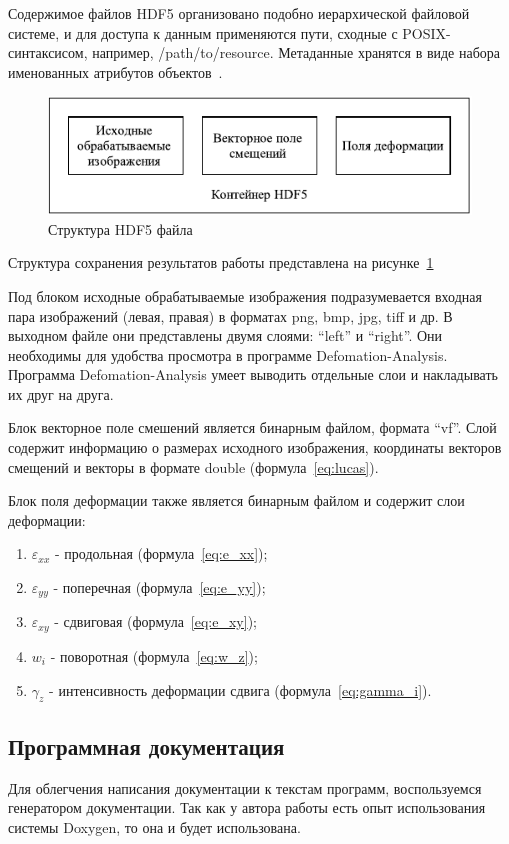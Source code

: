 Содержимое файлов HDF5 организовано подобно иерархической файловой системе, и для доступа к данным применяются пути, сходные с POSIX-синтаксисом, например, /path/to/resource. Метаданные хранятся в виде набора именованных атрибутов объектов~\cite{hdf5}.

\begin{figure}
\centering
\includegraphics[width=0.7\linewidth]{images/structHDF5.pdf}
\caption{Структура HDF5 файла}
\label{fig:structHDF5}
\end{figure}

Структура сохранения результатов работы представлена на рисунке~\ref{fig:structHDF5}

Под блоком исходные обрабатываемые изображения подразумевается входная пара изображений (левая, правая) в форматах png, bmp, jpg, tiff и др. В выходном файле они представлены двумя слоями: ``left'' и ``right''. Они необходимы для удобства просмотра в программе Defomation-Analysis. Программа Defomation-Analysis умеет выводить отдельные слои и накладывать их друг на друга.

Блок векторное поле смешений является бинарным файлом, формата ``vf''. Слой содержит информацию о размерах исходного изображения, координаты векторов смещений и векторы в формате double (формула~\ref{eq:lucas}).

Блок поля деформации также является бинарным файлом и содержит слои деформации:
\begin{enumerate}
\item $\varepsilon_{xx}$ - продольная (формула~\ref{eq:e_xx});
\item $\varepsilon_{yy}$ - поперечная (формула~\ref{eq:e_yy});
\item $\varepsilon_{xy}$ - сдвиговая (формула~\ref{eq:e_xy});
\item $w_{i}$ - поворотная (формула~\ref{eq:w_z});
\item $\gamma_z$ - интенсивность деформации сдвига (формула~\ref{eq:gamma_i}).
\end{enumerate}

\subsection{Программная документация}
Для облегчения написания документации к текстам программ, воспользуемся генератором документации. Так как у автора работы есть опыт использования системы Doxygen, то она и будет использована.

